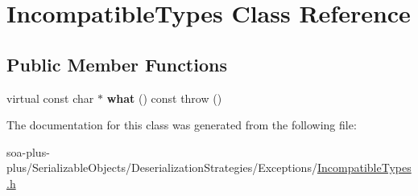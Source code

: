 \hypertarget{class_incompatible_types}{
\section{IncompatibleTypes Class Reference}
\label{class_incompatible_types}
}
\subsection*{Public Member Functions}
\begin{DoxyCompactItemize}
\item 
\hypertarget{class_incompatible_types_a249526a33c8868b7c4c42ba74c4a3146}{
virtual const char $\ast$ {\bfseries what} () const   throw ()}
\label{class_incompatible_types_a249526a33c8868b7c4c42ba74c4a3146}

\end{DoxyCompactItemize}


The documentation for this class was generated from the following file:\begin{DoxyCompactItemize}
\item 
soa-\/plus-\/plus/SerializableObjects/DeserializationStrategies/Exceptions/\hyperlink{_incompatible_types_8h}{IncompatibleTypes.h}\end{DoxyCompactItemize}
